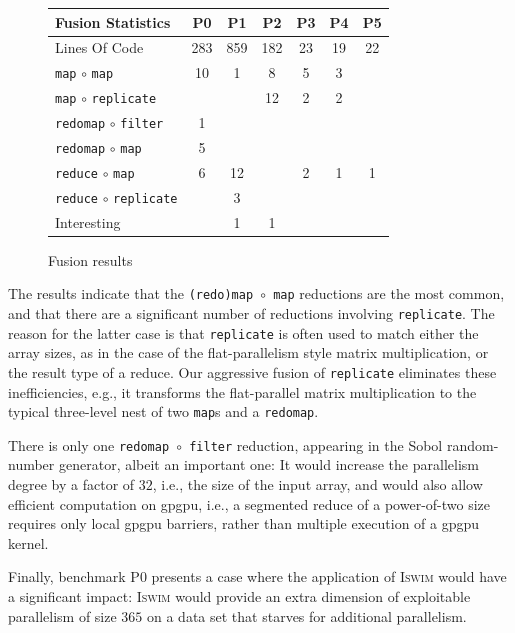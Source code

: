 \documentclass{sigplanconf}  %
\begin{document}
\begin{figure}
\begin{center}
\begin{tabular}{l|c|c|c|c|c|c}
Fusion Statistics & P0 & P1 & P2 & P3 & P4 & P5 \\\hline
Lines Of Code          & 283 & 859 & 182 & 23 & 19 & 22\\\hline\hline
{\tt map} $\circ$ {\tt map}          & 10 & 1  & 8  & 5 & 3  &   \\\hline
{\tt map} $\circ$ {\tt replicate}    &    &    & 12 & 2 & 2  &   \\\hline
{\tt redomap} $\circ$ {\tt filter}   & 1  &    &    &   &    &   \\\hline
{\tt redomap} $\circ$ {\tt map}      & 5  &    &    &   &    &   \\\hline
{\tt reduce} $\circ$ {\tt map}       & 6  & 12 &    & 2 & 1  & 1 \\\hline
{\tt reduce} $\circ$ {\tt replicate} &    & 3  &    &   &    &   \\\hline\hline
Interesting            &    & 1  & 1  &   &    &   \\\hline
\end{tabular}
\end{center}
\vspace{-2ex}
\caption{Fusion results}
\label{fig:fusion}
\end{figure}

The results indicate that the {\tt (redo)map $\circ$ map} reductions 
are the most common, and that there are a significant number of reductions 
involving {\tt replicate}.  The reason for the latter case is that
{\tt replicate} is often used to match either the array sizes, as in 
the case of the flat-parallelism style matrix multiplication, or the 
result type of a reduce. Our aggressive fusion of {\tt replicate}
eliminates these inefficiencies, e.g., it transforms the flat-parallel
matrix multiplication to the typical three-level nest of 
two {\tt map}s and a {\tt redomap}.

There is only one {\tt redomap $\circ$ filter} reduction, appearing 
in the Sobol random-number generator, albeit an important one:
It would increase the parallelism degree by a factor of $32$, i.e., the size 
of the input array, and would also allow efficient computation on {\sc gpgpu},
i.e., a segmented reduce of a power-of-two size requires only 
local {\sc gpgpu} barriers, rather than multiple execution of a 
{\sc gpgpu} kernel. 

Finally, benchmark P0 presents a case where the application of 
\textsc{Iswim} would have a significant impact: \textsc{Iswim} would provide 
an extra dimension of exploitable parallelism of size $365$ 
on a data set that starves for additional parallelism.
\end{document}
